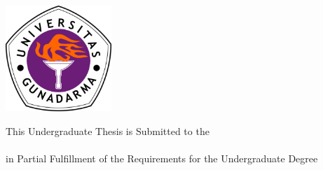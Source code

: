 \cleardoublepage
{}

\begin{titlepage}

\begin{adjustwidth}{0cm}{0cm}
\begin{center}

\large

\hfill

\vfill

\begingroup
{\LARGE
\color{RoyalPurple}{\myUni} \\
\myFacultyLong \\
}
\endgroup

\vfill

\includegraphics[width=4cm]{include/gunadarma-logo} \\ \medskip

\vfill

{\LARGE
\myTitle
}

\vfill


This Undergraduate Thesis is Submitted to the \\
\myFacultyLong \xspace \myUni \xspace \\
in Partial Fulfillment of the Requirements for the Undergraduate Degree

\bigskip

\myLocation \\
\myTime \\
\myVersion

\vfill

\end{center}
\end{adjustwidth}

\end{titlepage}


